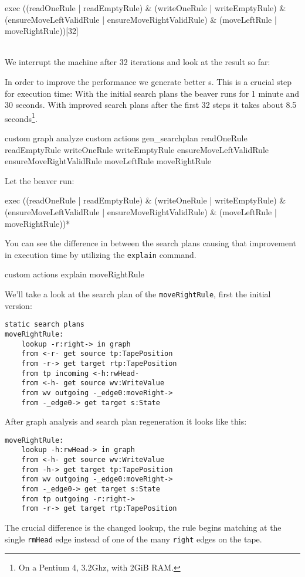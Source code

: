 \begin{grshell}[firstnumber=last]
  exec ((readOneRule | readEmptyRule) & (writeOneRule | writeEmptyRule) & (ensureMoveLeftValidRule | ensureMoveRightValidRule) & (moveLeftRule | moveRightRule))[32]
\end{grshell}

\quad\\We interrupt the machine after 32 iterations and look at the result so far:
\begin{center}
\end{center}
In order to improve the performance we generate better s.
This is a crucial step for execution time:
With the initial search plans the beaver runs for 1 minute and 30 seconds.
With improved search plans after the first 32 steps it takes about 8.5 seconds\footnote{On a Pentium 4, 3.2Ghz, with 2GiB RAM.}.

\begin{grshell}[firstnumber=last]
custom graph analyze
custom actions gen_searchplan readOneRule readEmptyRule writeOneRule writeEmptyRule ensureMoveLeftValidRule ensureMoveRightValidRule moveLeftRule moveRightRule
\end{grshell}

Let the beaver run:
\begin{grshell}[firstnumber=last]
  exec ((readOneRule | readEmptyRule) & (writeOneRule | writeEmptyRule) & (ensureMoveLeftValidRule | ensureMoveRightValidRule) & (moveLeftRule | moveRightRule))*
\end{grshell}

You can see the difference in between the search plans causing that improvement in execution time by utilizing the \texttt{explain} command.

\begin{grshell}
custom actions explain moveRightRule
\end{grshell}

We'll take a look at the search plan of the \texttt{moveRightRule}, first the initial version:

\begin{verbatim}
static search plans
moveRightRule:
    lookup -r:right-> in graph
    from <-r- get source tp:TapePosition
    from -r-> get target rtp:TapePosition
    from tp incoming <-h:rwHead-
    from <-h- get source wv:WriteValue
    from wv outgoing -_edge0:moveRight->
    from -_edge0-> get target s:State
\end{verbatim}

After graph analysis and search plan regeneration it looks like this:

\begin{verbatim}
moveRightRule:
    lookup -h:rwHead-> in graph
    from <-h- get source wv:WriteValue
    from -h-> get target tp:TapePosition
    from wv outgoing -_edge0:moveRight->
    from -_edge0-> get target s:State
    from tp outgoing -r:right->
    from -r-> get target rtp:TapePosition
\end{verbatim}

The crucial difference is the changed lookup, the rule begins matching at the single \texttt{rmHead} edge instead of one of the many \texttt{right} edges on the tape.
